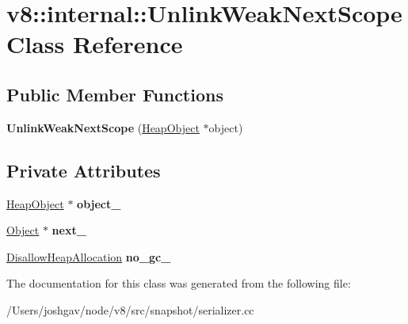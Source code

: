 \hypertarget{classv8_1_1internal_1_1_unlink_weak_next_scope}{}\section{v8\+:\+:internal\+:\+:Unlink\+Weak\+Next\+Scope Class Reference}
\label{classv8_1_1internal_1_1_unlink_weak_next_scope}
\subsection*{Public Member Functions}
\begin{DoxyCompactItemize}
\item 
{\bfseries Unlink\+Weak\+Next\+Scope} (\hyperlink{classv8_1_1internal_1_1_heap_object}{Heap\+Object} $\ast$object)\hypertarget{classv8_1_1internal_1_1_unlink_weak_next_scope_ab3085de8c7537ea3a76d83a250683365}{}\label{classv8_1_1internal_1_1_unlink_weak_next_scope_ab3085de8c7537ea3a76d83a250683365}

\end{DoxyCompactItemize}
\subsection*{Private Attributes}
\begin{DoxyCompactItemize}
\item 
\hyperlink{classv8_1_1internal_1_1_heap_object}{Heap\+Object} $\ast$ {\bfseries object\+\_\+}\hypertarget{classv8_1_1internal_1_1_unlink_weak_next_scope_a571bdbe1bc166ce034b54be9cb11cc6b}{}\label{classv8_1_1internal_1_1_unlink_weak_next_scope_a571bdbe1bc166ce034b54be9cb11cc6b}

\item 
\hyperlink{classv8_1_1internal_1_1_object}{Object} $\ast$ {\bfseries next\+\_\+}\hypertarget{classv8_1_1internal_1_1_unlink_weak_next_scope_aa32103ece926113f2cfc0d3486cd548c}{}\label{classv8_1_1internal_1_1_unlink_weak_next_scope_aa32103ece926113f2cfc0d3486cd548c}

\item 
\hyperlink{classv8_1_1internal_1_1_per_thread_assert_scope_debug_only}{Disallow\+Heap\+Allocation} {\bfseries no\+\_\+gc\+\_\+}\hypertarget{classv8_1_1internal_1_1_unlink_weak_next_scope_a245e700789bd1d268373873ce8308605}{}\label{classv8_1_1internal_1_1_unlink_weak_next_scope_a245e700789bd1d268373873ce8308605}

\end{DoxyCompactItemize}


The documentation for this class was generated from the following file\+:\begin{DoxyCompactItemize}
\item 
/\+Users/joshgav/node/v8/src/snapshot/serializer.\+cc\end{DoxyCompactItemize}
